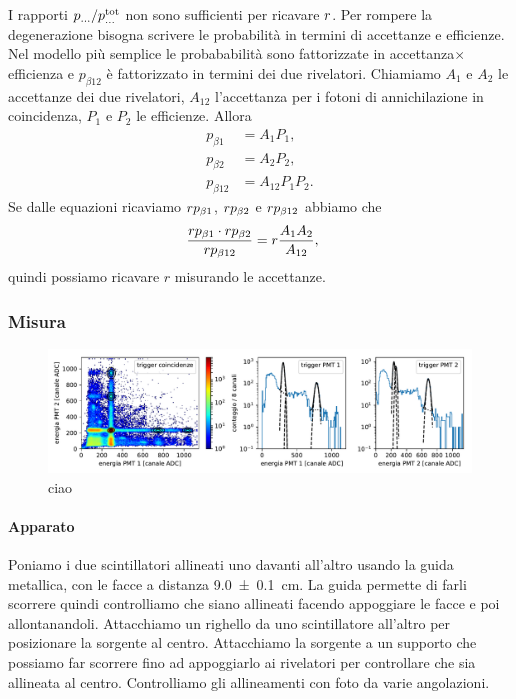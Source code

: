 I rapporti $p_{\dots} / p_{\dots}^\text{tot}$ non sono sufficienti per ricavare $r$.
Per rompere la degenerazione bisogna scrivere le probabilità in termini di accettanze e efficienze.
Nel modello più semplice le probababilità sono fattorizzate in accettanza$\times$efficienza
e $p_{\beta12}$ è fattorizzato in termini dei due rivelatori.
Chiamiamo $A_1$ e $A_2$ le accettanze dei due rivelatori,
$A_{12}$ l'accettanza per i fotoni di annichilazione in coincidenza,
$P_1$ e $P_2$ le efficienze.
Allora
\begin{align*}
	p_{\beta1}
	&= A_1 P_1, \\
	p_{\beta2}
	&= A_2 P_2, \\
	p_{\beta12}
	&= A_{12} P_1 P_2.
\end{align*}
Se dalle equazioni ricaviamo $r p_{\beta1}$, $r p_{\beta2}$ e $r p_{\beta12}$ abbiamo che
\begin{align*}
	\frac {r p_{\beta1} \cdot r p_{\beta2}} {r p_{\beta12}}
	&= r \frac{A_1 A_2}{A_{12}},
\end{align*}
quindi possiamo ricavare $r$ misurando le accettanze.

\subsubsection{Misura}

\begin{figure}
	\hspace{-0.2\textwidth}
	\includegraphics[width=1.4\textwidth]{immagini/ec}
	\caption{\label{fig:ec}
	ciao}
\end{figure}

\paragraph{Apparato}

Poniamo i due scintillatori allineati uno davanti all'altro usando la guida metallica,
con le facce a distanza \SI{9.0 \pm 0.1}{cm}.
La guida permette di farli scorrere quindi controlliamo che siano allineati
facendo appoggiare le facce e poi allontanandoli.
Attacchiamo un righello da uno scintillatore all'altro per posizionare la sorgente al centro.
Attacchiamo la sorgente a un supporto che possiamo far scorrere fino ad appoggiarlo ai rivelatori
per controllare che sia allineata al centro.
Controlliamo gli allineamenti con foto da varie angolazioni.

